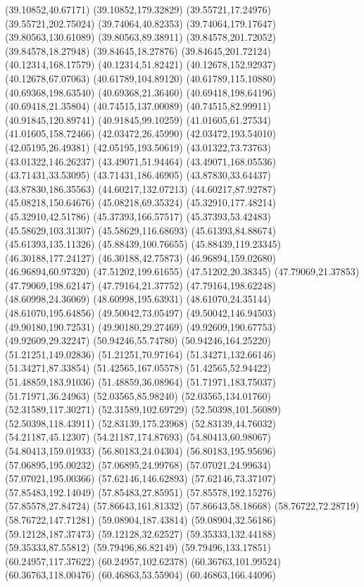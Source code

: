 {(39.10852,40.67171) (39.10852,179.32829) (39.55721,17.24976) (39.55721,202.75024) (39.74064,40.82353) (39.74064,179.17647) (39.80563,130.61089) (39.80563,89.38911)
(39.84578,201.72052) (39.84578,18.27948) (39.84645,18.27876) (39.84645,201.72124) (40.12314,168.17579) (40.12314,51.82421) (40.12678,152.92937) (40.12678,67.07063)
(40.61789,104.89120) (40.61789,115.10880) (40.69368,198.63540) (40.69368,21.36460) (40.69418,198.64196) (40.69418,21.35804) (40.74515,137.00089) (40.74515,82.99911)
(40.91845,120.89741) (40.91845,99.10259) (41.01605,61.27534) (41.01605,158.72466) (42.03472,26.45990) (42.03472,193.54010) (42.05195,26.49381) (42.05195,193.50619)
(43.01322,73.73763) (43.01322,146.26237) (43.49071,51.94464) (43.49071,168.05536) (43.71431,33.53095) (43.71431,186.46905) (43.87830,33.64437) (43.87830,186.35563)
(44.60217,132.07213) (44.60217,87.92787) (45.08218,150.64676) (45.08218,69.35324) (45.32910,177.48214) (45.32910,42.51786) (45.37393,166.57517) (45.37393,53.42483)
(45.58629,103.31307) (45.58629,116.68693) (45.61393,84.88674) (45.61393,135.11326) (45.88439,100.76655) (45.88439,119.23345) (46.30188,177.24127) (46.30188,42.75873)
(46.96894,159.02680) (46.96894,60.97320) (47.51202,199.61655) (47.51202,20.38345) (47.79069,21.37853) (47.79069,198.62147) (47.79164,21.37752) (47.79164,198.62248)
(48.60998,24.36069) (48.60998,195.63931) (48.61070,24.35144) (48.61070,195.64856) (49.50042,73.05497) (49.50042,146.94503) (49.90180,190.72531) (49.90180,29.27469)
(49.92609,190.67753) (49.92609,29.32247) (50.94246,55.74780) (50.94246,164.25220) (51.21251,149.02836) (51.21251,70.97164) (51.34271,132.66146) (51.34271,87.33854)
(51.42565,167.05578) (51.42565,52.94422) (51.48859,183.91036) (51.48859,36.08964) (51.71971,183.75037) (51.71971,36.24963) (52.03565,85.98240) (52.03565,134.01760)
(52.31589,117.30271) (52.31589,102.69729) (52.50398,101.56089) (52.50398,118.43911) (52.83139,175.23968) (52.83139,44.76032) (54.21187,45.12307) (54.21187,174.87693)
(54.80413,60.98067) (54.80413,159.01933) (56.80183,24.04304) (56.80183,195.95696) (57.06895,195.00232) (57.06895,24.99768) (57.07021,24.99634) (57.07021,195.00366)
(57.62146,146.62893) (57.62146,73.37107) (57.85483,192.14049) (57.85483,27.85951) (57.85578,192.15276) (57.85578,27.84724) (57.86643,161.81332) (57.86643,58.18668)
(58.76722,72.28719) (58.76722,147.71281) (59.08904,187.43814) (59.08904,32.56186) (59.12128,187.37473) (59.12128,32.62527) (59.35333,132.44188) (59.35333,87.55812)
(59.79496,86.82149) (59.79496,133.17851) (60.24957,117.37622) (60.24957,102.62378) (60.36763,101.99524) (60.36763,118.00476) (60.46863,53.55904) (60.46863,166.44096)
}

